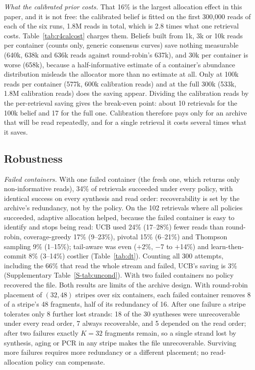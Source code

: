 \documentclass[conference,onecolumn,11pt]{IEEEtran}
\begin{document}

\emph{What the calibrated prior costs.}  That 16\% is the largest allocation effect in this paper, and
it is not free: the calibrated belief is fitted on the first 300{,}000 reads of each of the six runs,
1.8M reads in total, which is 2.8 times what one retrieval costs.  Table~\ref{tab:r4calcost} charges
them.  Beliefs built from 1k, 3k or 10k reads per container (counts only, generic consensus curves)
save nothing measurable (640k, 638k and 636k reads against round-robin's 637k), and 30k per container is
worse (658k), because a half-informative estimate of a container's abundance distribution misleads the
allocator more than no estimate at all.  Only at 100k reads per container (577k, 600k calibration reads)
and at the full 300k (533k, 1.8M calibration reads) does the saving appear.  Dividing the calibration
reads by the per-retrieval saving gives the break-even point: about 10 retrievals for the 100k belief and
17 for the full one.  Calibration therefore pays only for an archive that will be read repeatedly, and for
a single retrieval it costs several times what it saves.

\subsection{Robustness}\label{sec:res-robust}\label{sec:res-fail}\label{sec:res-uncond}
\emph{Failed containers.}  With one failed container (the fresh one, which returns only non-informative
reads), 34\% of retrievals succeeded under every policy, with identical success on every synthesis and
read order: recoverability is set by the archive's redundancy, not by the policy.  On the 102 retrievals
where all policies succeeded, adaptive allocation helped, because the failed container is easy to
identify and stops being read: UCB used 24\% (17--28\%) fewer reads than round-robin, coverage-greedy
17\% (9--23\%), pivotal 15\% (6--21\%) and Thompson sampling 9\% (1--15\%); tail-aware was even ($+$2\%, $-$7 to $+$14\%) and
learn-then-commit 8\% (3--14\%) costlier (Table~\ref{tab:dt}).  Counting all 300 attempts, including the
66\% that read the whole stream and failed, UCB's saving is 3\% (Supplementary Table~\ref{S-tab:uncond}).
With two failed containers no policy recovered the file.  Both results are limits of the archive design.
With round-robin placement of $(32,48)$ stripes over six containers, each failed container removes 8 of a
stripe's 48 fragments, half of its redundancy of 16.  After one failure a stripe tolerates only 8 further
lost strands: 18 of the 30 syntheses were unrecoverable under every read order, 7 always recoverable, and
5 depended on the read order; after two failures exactly $K{=}32$ fragments remain, so a single strand
lost by synthesis, aging or PCR in any stripe makes the file unrecoverable.  Surviving more failures
requires more redundancy or a different placement; no read-allocation policy can compensate.
\end{document}
